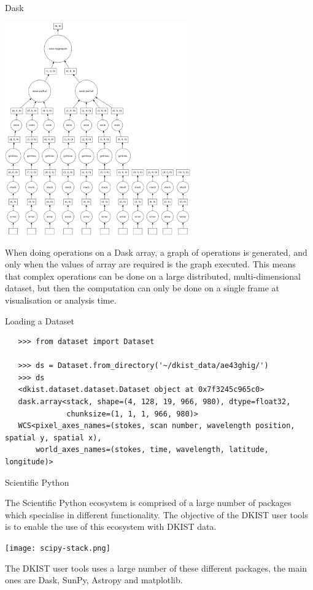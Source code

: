 \documentclass[landscape,a0paper,fontscale=0.32]{baposter}
\begin{document}
\begin{poster}
\begin{posterbox}[name=dask,column=1,row=0,span=1,below=intro]{Dask}
  \begin{center}
    \includegraphics[width=0.6\textwidth]{mydask.png}
  \end{center}

  When doing operations on a Dask array, a graph of operations is generated, and
  only when the values of array are required is the graph executed. This means
  that complex operations can be done on a large distributed, multi-dimensional
  dataset, but then the computation can only be done on a single frame at
  visualisation or analysis time.

\end{posterbox}
 
\begin{posterbox}[name=dataset,column=2,row=0,span=2]{Loading a Dataset}
 
  \begin{verbatim}
   >>> from dataset import Dataset

   >>> ds = Dataset.from_directory('~/dkist_data/ae43ghig/')
   >>> ds
   <dkist.dataset.dataset.Dataset object at 0x7f3245c965c0>
   dask.array<stack, shape=(4, 128, 19, 966, 980), dtype=float32,
              chunksize=(1, 1, 1, 966, 980)>
   WCS<pixel_axes_names=(stokes, scan number, wavelength position, spatial y, spatial x),
       world_axes_names=(stokes, time, wavelength, latitude, longitude)>
  \end{verbatim}

\end{posterbox}

\begin{posterbox}[name=scipy,column=3,row=0,span=1,below=dataset]{Scientific Python}

  The Scientific Python ecosystem is comprised of a large number of packages
  which specialise in different functionality. The objective of the DKIST user
  tools is to enable the use of this ecosystem with DKIST data.
  
  \texttt{[image: scipy-stack.png]}

  The DKIST user tools uses a large number of these different packages, the main
  ones are Dask, SunPy, Astropy and matplotlib.

\end{posterbox}


\end{poster}
\end{document}
